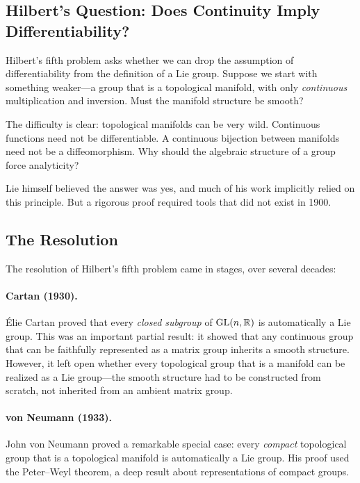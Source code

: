 \subsection{Hilbert's Question: Does Continuity Imply Differentiability?}

Hilbert's fifth problem asks whether we can drop the assumption of differentiability from the definition of a Lie group. Suppose we start with something weaker---a group that is a topological manifold, with only \emph{continuous} multiplication and inversion. Must the manifold structure be smooth?

The difficulty is clear: topological manifolds can be very wild. Continuous functions need not be differentiable. A continuous bijection between manifolds need not be a diffeomorphism. Why should the algebraic structure of a group force analyticity?

Lie himself believed the answer was yes, and much of his work implicitly relied on this principle. But a rigorous proof required tools that did not exist in 1900.

\subsection{The Resolution}

The resolution of Hilbert's fifth problem came in stages, over several decades:

\paragraph{Cartan (1930).} Élie Cartan proved that every \emph{closed subgroup} of $\operatorname{GL}(n,\mathbb{R})$ is automatically a Lie group. This was an important partial result: it showed that any continuous group that can be faithfully represented as a matrix group inherits a smooth structure. However, it left open whether every topological group that is a manifold can be realized as a Lie group---the smooth structure had to be constructed from scratch, not inherited from an ambient matrix group.

\paragraph{von Neumann (1933).} John von Neumann proved a remarkable special case: every \emph{compact} topological group that is a topological manifold is automatically a Lie group. His proof used the Peter--Weyl theorem, a deep result about representations of compact groups.

